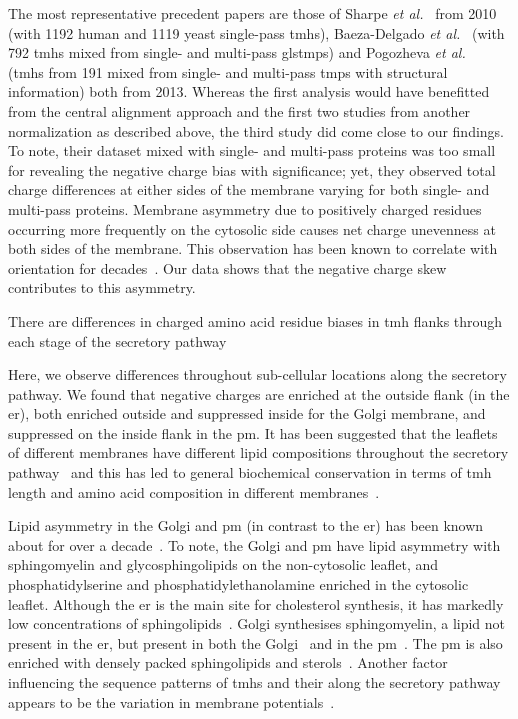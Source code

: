 The most representative precedent papers are those of Sharpe \textit{et al.}~\cite{Sharpe2010} from 2010 (with 1192 human and 1119 yeast single-pass \gls{tmh}s), Baeza-Delgado \textit{et al.}~\cite{Baeza-Delgado2013} (with 792 \gls{tmh}s mixed from single- and multi-pass gls{tmp}s) and Pogozheva \textit{et al.}~\cite{Pogozheva2013} (\gls{tmh}s from 191 mixed from single- and multi-pass \gls{tmp}s with structural information) both from 2013. Whereas the first analysis would have benefitted from the central alignment approach and the first two studies from another normalization as described above, the third study did come close to our findings. To note, their dataset mixed with single- and multi-pass proteins was too small for revealing the negative charge bias with significance; yet, they observed total charge differences at either sides of the membrane varying for both single- and multi-pass proteins. Membrane asymmetry due to positively charged residues occurring more frequently on the cytosolic side causes net charge unevenness at both sides of the membrane. This observation has been known to correlate with orientation for decades~\cite{VonHeijne1989, Baeza-Delgado2013, Meindl-Beinker2006}. Our data shows that the negative charge skew contributes to this asymmetry.

There are differences in charged amino acid residue biases in \gls{tmh} flanks through each stage of the secretory pathway

Here, we observe differences throughout sub-cellular locations along the secretory pathway. We found that negative charges are enriched at the outside flank (in the \gls{er}), both enriched outside and suppressed inside for the Golgi membrane, and suppressed on the inside flank in the \gls{pm}. It has been suggested that the leaflets of different membranes have different lipid compositions throughout the secretory pathway~\cite{VanMeer2008} and this has led to general biochemical conservation in terms of \gls{tmh} length and amino acid composition in different membranes~\cite{Sharpe2010, Pogozheva2013}.

Lipid asymmetry in the Golgi and \gls{pm} (in contrast to the \gls{er}) has been known about for over a decade~\cite{Daleke2007, Devaux2004}. To note, the Golgi and \gls{pm} have lipid asymmetry with sphingomyelin and glycosphingolipids on the non-cytosolic leaflet, and phosphatidylserine and phosphatidylethanolamine enriched in the cytosolic leaflet. Although the \gls{er} is the main site for cholesterol synthesis, it has markedly low concentrations of sphingolipids~\cite{Bell1981}. Golgi synthesises sphingomyelin, a lipid not present in the \gls{er}, but present in both the Golgi~\cite{Futerman2005} and in the \gls{pm}~\cite{Li2007, Tafesse2007}. The \gls{pm} is also enriched with densely packed sphingolipids and sterols~\cite{Paolo2006}. Another factor influencing the sequence patterns of \gls{tmh}s and their along the secretory pathway appears to be the variation in membrane potentials~\cite{Qin2011, Worley1994, Schapiro2000}.

